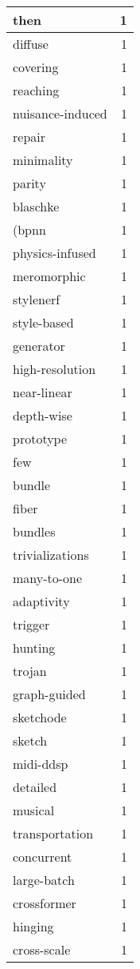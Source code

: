 \begin{table}[h]
\begin{tabular}{|l|r|}
\hline
then & 1 \\
\hline
diffuse & 1 \\
\hline
covering & 1 \\
\hline
reaching & 1 \\
\hline
nuisance-induced & 1 \\
\hline
repair & 1 \\
\hline
minimality & 1 \\
\hline
parity & 1 \\
\hline
blaschke & 1 \\
\hline
(bpnn & 1 \\
\hline
physics-infused & 1 \\
\hline
meromorphic & 1 \\
\hline
stylenerf & 1 \\
\hline
style-based & 1 \\
\hline
generator & 1 \\
\hline
high-resolution & 1 \\
\hline
near-linear & 1 \\
\hline
depth-wise & 1 \\
\hline
prototype & 1 \\
\hline
few & 1 \\
\hline
bundle & 1 \\
\hline
fiber & 1 \\
\hline
bundles & 1 \\
\hline
trivializations & 1 \\
\hline
many-to-one & 1 \\
\hline
adaptivity & 1 \\
\hline
trigger & 1 \\
\hline
hunting & 1 \\
\hline
trojan & 1 \\
\hline
graph-guided & 1 \\
\hline
sketchode & 1 \\
\hline
sketch & 1 \\
\hline
midi-ddsp & 1 \\
\hline
detailed & 1 \\
\hline
musical & 1 \\
\hline
transportation & 1 \\
\hline
concurrent & 1 \\
\hline
large-batch & 1 \\
\hline
crossformer & 1 \\
\hline
hinging & 1 \\
\hline
cross-scale & 1 \\

\end{tabular}
\end{table}
